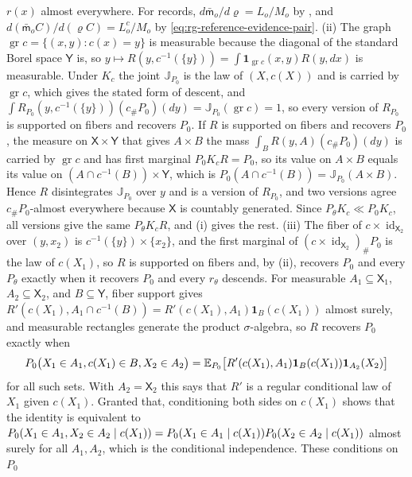 $r(x)$ almost everywhere. For records, $d\bar{\mathsf m}_o/d\varrho=L_o/M_o$ by
, and $d(\bar{\mathsf m}_oC)/d(\varrho C)=L^c_o/M_o$ by
\eqref{eq:rg-reference-evidence-pair}. (ii) The graph $\operatorname{gr}c=\{(x,y):c(x)=y\}$ is
measurable because the diagonal of the standard Borel space $\mathsf Y$ is, so
$y\mapsto R(y,c^{-1}(\{y\}))=\int\mathbf 1_{\operatorname{gr}c}(x,y)R(y,dx)$ is measurable. Under $K_c$
the joint $\mathbb J_{P_0}$ is the law of $(X,c(X))$ and is carried by $\operatorname{gr}c$, which gives
the stated form of descent, and $\int R_{P_0}(y,c^{-1}(\{y\}))(c_\#P_0)(dy)=\mathbb J_{P_0}(\operatorname{gr}c)=1$,
so every version of $R_{P_0}$ is supported on fibers and recovers $P_0$. If $R$ is supported on fibers
and recovers $P_0$, the measure on $\mathsf X\times\mathsf Y$ that gives $A\times B$ the mass
$\int_BR(y,A)(c_\#P_0)(dy)$ is carried by $\operatorname{gr}c$ and has first marginal $P_0K_cR=P_0$, so
its value on $A\times B$ equals its value on $(A\cap c^{-1}(B))\times\mathsf Y$, which is
$P_0(A\cap c^{-1}(B))=\mathbb J_{P_0}(A\times B)$. Hence $R$ disintegrates $\mathbb J_{P_0}$ over $y$ and
is a version of $R_{P_0}$, and two versions agree $c_\#P_0$-almost everywhere because $\mathsf X$ is
countably generated. Since $P_\theta K_c\ll P_0K_c$, all versions give the same $P_\theta K_cR$, and (i)
gives the rest. (iii) The fiber of $c\times\operatorname{id}_{\mathsf X_2}$ over $(y,x_2)$ is
$c^{-1}(\{y\})\times\{x_2\}$, and the first marginal of $(c\times\operatorname{id}_{\mathsf X_2})_\#P_0$
is the law of $c(X_1)$, so $R$ is supported on fibers and, by (ii), recovers $P_0$ and every $P_\theta$
exactly when it recovers $P_0$ and every $r_\theta$ descends. For measurable $A_1\subseteq\mathsf X_1$,
$A_2\subseteq\mathsf X_2$, and $B\subseteq\mathsf Y$, fiber support gives
$R'(c(X_1),A_1\cap c^{-1}(B))=R'(c(X_1),A_1)\mathbf 1_B(c(X_1))$ almost surely, and measurable
rectangles generate the product $\sigma$-algebra, so $R$ recovers $P_0$ exactly when
\begin{equation*}
P_0\bigl(X_1\in A_1,c(X_1)\in B,X_2\in A_2\bigr)
=\mathbb E_{P_0}\bigl[R'(c(X_1),A_1)\mathbf 1_B(c(X_1))\mathbf 1_{A_2}(X_2)\bigr]
\end{equation*}
for all such sets. With $A_2=\mathsf X_2$ this says that $R'$ is a regular conditional law of $X_1$ given
$c(X_1)$. Granted that, conditioning both sides on $c(X_1)$ shows that the identity is equivalent to
$P_0(X_1\in A_1,X_2\in A_2\mid c(X_1))=P_0(X_1\in A_1\mid c(X_1))P_0(X_2\in A_2\mid c(X_1))$
almost surely for all $A_1,A_2$, which is the conditional independence. These conditions on $P_0$
